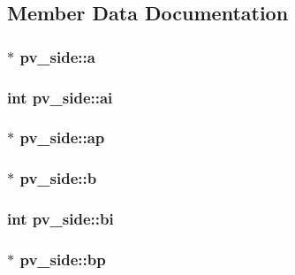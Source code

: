 \subsection{Member Data Documentation}
\hypertarget{structpv__side_ac696ba7ef00b7bd57fd286b002473805}{
\subsubsection[{a}]{$\ast$ pv\-\_\-side\-::a}}\label{structpv__side_ac696ba7ef00b7bd57fd286b002473805}
\hypertarget{structpv__side_ac5321a47babd8c9d8d15c486d0b94f3e}{
\subsubsection[{ai}]{\setlength{\rightskip}{0pt plus 5cm}int pv\-\_\-side\-::ai}}\label{structpv__side_ac5321a47babd8c9d8d15c486d0b94f3e}
\hypertarget{structpv__side_af15ca1b413508ff5bcdd7febe266cb00}{
\subsubsection[{ap}]{$\ast$ pv\-\_\-side\-::ap}}\label{structpv__side_af15ca1b413508ff5bcdd7febe266cb00}
\hypertarget{structpv__side_a61ccae24216776d1395abb33999a921c}{
\subsubsection[{b}]{$\ast$ pv\-\_\-side\-::b}}\label{structpv__side_a61ccae24216776d1395abb33999a921c}
\hypertarget{structpv__side_ae76d8647bc2e09adea965cf804e48165}{
\subsubsection[{bi}]{\setlength{\rightskip}{0pt plus 5cm}int pv\-\_\-side\-::bi}}\label{structpv__side_ae76d8647bc2e09adea965cf804e48165}
\hypertarget{structpv__side_a5582f9b842acaa2aa4a54be2beff5af5}{
\subsubsection[{bp}]{$\ast$ pv\-\_\-side\-::bp}}\label{structpv__side_a5582f9b842acaa2aa4a54be2beff5af5}
